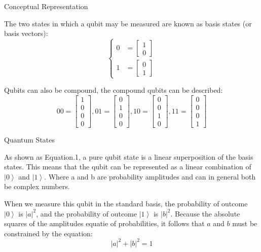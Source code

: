 \documentclass[beamer,serif]{beamer}
\begin{document}
\begin{frame}{Conceptual Representation}{}
	\par The two states in which a qubit may be measured are known as basis states (or basis vectors):
	\begin{equation}
		\left\{
		\begin{aligned}
			0 & = \begin{bmatrix} 1 \\ 0 \end{bmatrix} \\
			1 & = \begin{bmatrix} 0 \\ 1 \end{bmatrix}
		\end{aligned}
		\right.
	\end {equation}
	\par Qubits can also be compound, the compound qubits can be described:
	\begin{equation}
			00 = \begin{bmatrix} 1 \\ 0 \\ 0 \\ 0 \end{bmatrix} ,
			01 = \begin{bmatrix} 0 \\ 1 \\ 0 \\ 0 \end{bmatrix} ,
			10 = \begin{bmatrix} 0 \\ 0 \\ 1 \\ 0 \end{bmatrix} ,
			11 = \begin{bmatrix} 0 \\ 0 \\ 0 \\ 1 \end{bmatrix}
	\end {equation}	
\end{frame}

\begin{frame}{Quantum States}{}
	\par As shown as Equation.1, a pure qubit state is a linear superposition of the basis states. This means that the qubit can be represented as a linear combination of $\left| 0 \right\rangle$ and $\left| 1 \right\rangle$. Where a and b are probability amplitudes and can in general both be complex numbers.
	\par When we measure this qubit in the standard basis, the probability of outcome $\left| 0 \right\rangle$ is $|a|^{2}$, and the probability of outcome $\left| 1 \right\rangle$ is $|b|^{2}$. Because the absolute squares of the amplitudes equatie of probabilities, it follows that $a$ and $b$ must be constrained by the equation:
	\begin{equation}
		|a|^{2}+|b|^{2}=1
	\end {equation}	
\end{frame}
\end{document}
